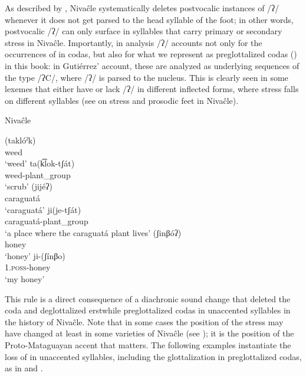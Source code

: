 As described by \citet[183–184]{AnG16c}, Nivaĉle systematically deletes postvocalic instances of /ʔ/ whenever it does not get parsed to the head syllable of the foot; in other words, postvocalic /ʔ/ can only surface in syllables that carry primary or secondary stress in Nivaĉle. Importantly, in  analysis /ʔ/ accounts not only for the occurrences of  in codas, but also for what we represent as preglottalized codas () in this book: in Gutiérrez' account, these are analyzed as underlying sequences of the type /ʔC/, where /ʔ/ is parsed to the nucleus. This is clearly seen in some lexemes that either have or lack /ʔ/ in different inflected forms, where stress falls on different syllables (see  on stress and prosodic feet in Nivaĉle).

\ea\label{ex:coda-deg:niv}
Nivaĉle \citep[183–184]{AnG16c}\\
    \begin{xlist}
        \ex\gll (taklóˀk)\\
                weed\\
                \glt `weed'
        \ex\gll ta(k͡lok-tʃát)\\
                weed-plant\_group\\
                \glt `scrub'
        \ex\gll (jijéʔ)\\
                caraguatá\\
                \glt `caraguatá'
        \ex\gll ji(je-tʃát)\\
                caraguatá-plant\_group\\
                \glt `a place where the caraguatá plant lives'
        \ex\gll (ʃinβóʔ)\\
                honey\\
                \glt `honey'
        \ex\gll ji-(ʃínβo)\\
                1.\textsc{poss}-honey\\
                \glt `my honey'
    \end{xlist}
\z

This rule is a direct consequence of a diachronic sound change that deleted the coda  and deglottalized erstwhile preglottalized codas in unaccented syllables in the history of Nivaĉle. Note that in some cases the position of the stress may have changed at least in some varieties of Nivaĉle (see ); it is the position of the Proto-Mataguayan accent that matters. The following examples instantiate the loss of  in unaccented syllables, including the glottalization in preglottalized codas, as in  and .

